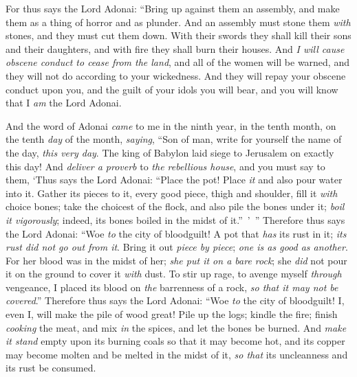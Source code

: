 \begin{biblechapter}
\verse For thus says the Lord Adonai: “Bring up against them an assembly, and make them as a thing of horror and as plunder.
\verse And an assembly must stone them \textit{with} stones, and they must cut them down. With their swords they shall kill their sons and their daughters, and with fire they shall burn their houses.
\verse And \textit{I will cause obscene conduct to cease from the land}, and all of the women will be warned, and they will not do according to your wickedness.
\verse And they will repay your obscene conduct upon you, and the guilt of your idols you will bear, and you will know that I \textit{am} the Lord Adonai.
\end{biblechapter}

\begin{biblechapter} %
 And the word of Adonai \textit{came} to me in the ninth year, in the tenth month, on the tenth \textit{day} of the month, \textit{saying},
\verse “Son of man, write for yourself the name of the day, \textit{this very day}. The king of Babylon laid siege to Jerusalem on exactly this day!
\verse And \textit{deliver a proverb} to \textit{the rebellious house}, and you must say to them, ‘Thus says the Lord Adonai: “Place the pot! Place \textit{it} and also pour water into it.
\verse Gather its pieces to it, every good piece, thigh and shoulder, fill it \textit{with} choice bones;
\verse take the choicest of the flock, and also pile the bones under it; \textit{boil it vigorously}; indeed, its bones boiled in the midst of it.” ’ ”
\verse Therefore thus says the Lord Adonai: “Woe \textit{to} the city of bloodguilt! A pot that \textit{has} its rust in it; \textit{its rust did not go out from it}. Bring it out \textit{piece by piece}; \textit{one is as good as another}.
\verse For her blood was in the midst of her; \textit{she put it on a bare rock}; she \textit{did} not pour it on the ground to cover it \textit{with} dust.
\verse To stir up rage, to avenge myself \textit{through} vengeance, I placed its blood on \textit{the} barrenness of a rock, \textit{so that it may not be covered}.”
\verse Therefore thus says the Lord Adonai: “Woe \textit{to} the city of bloodguilt! I, even I, will make the pile of wood great!
\verse Pile up the logs; kindle the fire; finish \textit{cooking} the meat, and mix \textit{in} the spices, and let the bones be burned.
\verse And \textit{make it stand} empty upon its burning coals so that it may become hot, and its copper may become molten and be melted in the midst of it, \textit{so that} its uncleanness and its rust be consumed.

\end{biblechapter}
